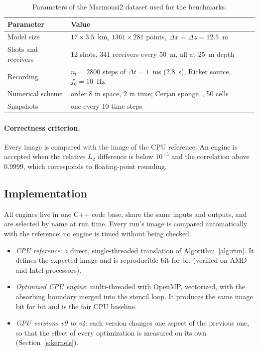 \documentclass[letterpaper,11pt,leqno]{article}
\begin{document}
\begin{table}[!htb]
\centering
\caption{Parameters of the Marmousi2 dataset used for the benchmarks.}
\label{tab:dataset}
\begin{tabular}{ll}
\toprule
Parameter              & Value \\
\midrule
Model size             & $17 \times 3.5$~km, $1361 \times 281$ points, $\Delta x = \Delta z = 12.5$~m \\
Shots and receivers    & 12 shots, 341 receivers every 50~m, all at 25~m depth \\
Recording              & $n_t = 2800$ steps of $\Delta t = 1$~ms (2.8~s), Ricker source, $f_0 = 10$~Hz \\
Numerical scheme       & order 8 in space, 2 in time; Cerjan sponge~\citep{Cerjan1985}, 50 cells \\
Snapshots              & one every 10 time steps \\
\bottomrule
\end{tabular}
\end{table}

\paragraph{Correctness criterion.} Every image is compared with the image of the CPU reference. An engine is accepted when the relative $L_2$ difference is below $10^{-5}$ and the correlation above $0.9999$, which corresponds to floating-point rounding.

\subsection{Implementation}

All engines live in one C++ code base, share the same inputs and outputs, and are selected by name at run time. Every run's image is compared automatically with the reference: no engine is timed without being checked.

\begin{itemize}
\item \emph{CPU reference}: a direct, single-threaded translation of Algorithm~\ref{alg:rtm}. It defines the expected image and is reproducible bit for bit (verified on AMD and Intel processors).
\item \emph{Optimized CPU engine}: multi-threaded with OpenMP, vectorized, with the absorbing boundary merged into the stencil loop. It produces the same image bit for bit and is the fair CPU baseline.
\item \emph{GPU versions v0 to v4}: each version changes one aspect of the previous one, so that the effect of every optimization is measured on its own (Section~\ref{s:kernels}).
\end{itemize}
\end{document}
